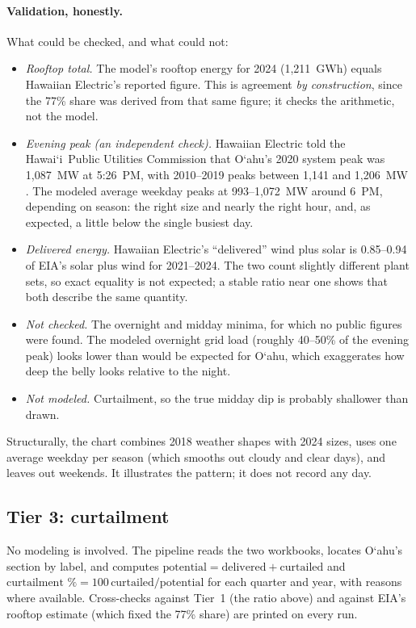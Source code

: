 \documentclass[11pt,a4paper]{article}
\newcommand{\okina}{\textquoteleft}
\newcommand{\Oahu}{\texorpdfstring{O\okina ahu}{Oahu}}
\newcommand{\Hawaii}{\texorpdfstring{Hawai\okina i}{Hawaii}}
\begin{document}
\paragraph{Validation, honestly.} What could be checked, and what could not:
\begin{itemize}
\item \emph{Rooftop total.} The model's rooftop energy for 2024 (1,211~GWh) equals Hawaiian Electric's reported
 figure. This is agreement \emph{by construction}, since the 77\% share was derived from that same figure; it
 checks the arithmetic, not the model.
\item \emph{Evening peak (an independent check).} Hawaiian Electric told the \Hawaii\ Public Utilities Commission
 that \Oahu's 2020 system peak was 1,087~MW at 5:26~PM, with 2010--2019 peaks between 1,141 and 1,206~MW
 \cite{adequacy}. The modeled average weekday peaks at 993--1,072~MW around 6~PM, depending on season: the right
 size and nearly the right hour, and, as expected, a little below the single busiest day.
\item \emph{Delivered energy.} Hawaiian Electric's ``delivered'' wind plus solar is 0.85--0.94 of EIA's solar plus wind
 for 2021--2024. The two count slightly different plant sets, so exact equality is not expected; a stable ratio
 near one shows that both describe the same quantity.
\item \emph{Not checked.} The overnight and midday minima, for which no public figures were found. The modeled overnight
 grid load (roughly 40--50\% of the evening peak) looks lower than would be expected for \Oahu, which exaggerates
 how deep the belly looks relative to the night.
\item \emph{Not modeled.} Curtailment, so the true midday dip is probably shallower than drawn.
\end{itemize}
Structurally, the chart combines 2018 weather shapes with 2024 sizes, uses one average weekday per season (which
smooths out cloudy and clear days), and leaves out weekends. It illustrates the pattern; it does not record any day.

\subsection{Tier 3: curtailment}
No modeling is involved. The pipeline reads the two workbooks, locates \Oahu's section by label, and computes
$\text{potential}=\text{delivered}+\text{curtailed}$ and $\text{curtailment \%}=100\,\text{curtailed}/\text{potential}$
for each quarter and year, with reasons where available. Cross-checks against Tier~1 (the ratio above) and
against EIA's rooftop estimate (which fixed the 77\% share) are printed on every run.
\end{document}
